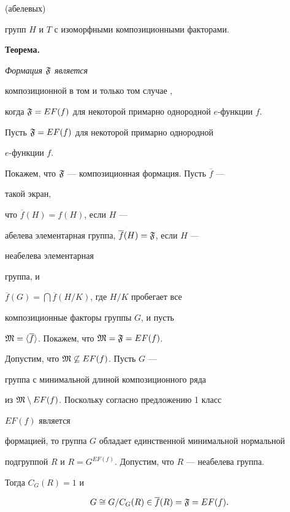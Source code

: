 (абелевых)


групп $H$ и $T$ с изоморфными композиционными факторами.


\medskip





{\bf Теорема.} {\it Формация $\frak{F}$ является


композиционной в том и только том случае ,


когда $\frak{F}=EF(f)$ для некоторой примарно однородной $e$-функции $f$.}





\begin{pf}


Пусть $\frak{F}=EF(f)$ для некоторой примарно однородной


$e$-функции $f$.


Покажем, что $\frak{F}$ --- композиционная формация. Пусть $\overline f$ ---


такой экран,


что $\overline f(H)=f(H)$, если $H$ ---


абелева элементарная группа, $\overline f(H)=\frak{F}$, если $H$  ---


неабелева элементарная


группа, и


$\overline f(G)=\bigcap\overline f(H/K)$, где $H/K$ пробегает все


композиционные факторы группы $G$, и пусть


$\frak{M}=\langle\overline f\rangle$. Покажем, что $\frak{M}=\frak{F}=EF(f)$.





Допустим, что $\frak{M}\not\subseteq EF(f)$. Пусть $G$ ---


группа с минимальной длиной композиционного ряда


из $\frak{M}\setminus EF(f)$. Поскольку согласно предложению 1 класс


$EF(f)$ является


формацией, то группа $G$ обладает единственной минимальной нормальной


подгруппой $R$ и $R=G^{EF(f)}$. Допустим, что $R$ --- неабелева группа.


Тогда $C_G(R)=1$ и


$$


G\cong G/C_G(R)\in \overline f(R)=\frak{F}=EF(f).


$$



\end{pf}
